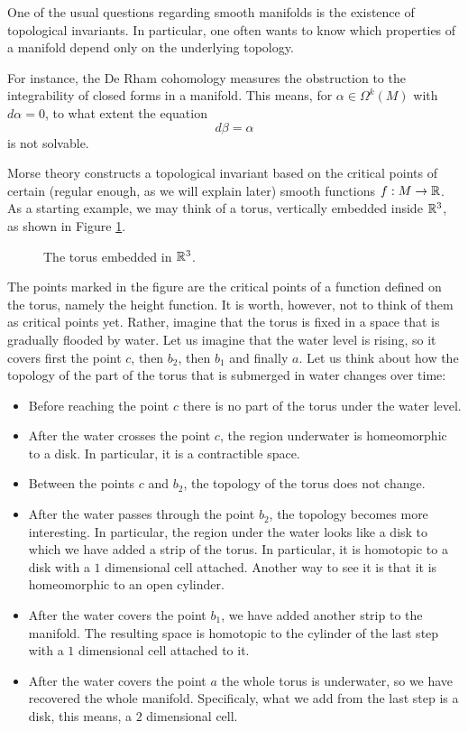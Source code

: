 One of the usual questions regarding smooth manifolds is the existence of topological invariants. In particular, one often wants to know which properties of a manifold depend only on the underlying topology.

For instance, the De Rham cohomology measures the obstruction to the integrability of closed forms in a manifold. This means, for $\alpha \in \Omega^k(M)$ with $d\alpha = 0$, to what extent the equation
\[d\beta = \alpha\]
is not solvable.

Morse theory constructs a topological invariant based on the critical points of certain (regular enough, as we will explain later) smooth functions $f : M \rightarrow \mathbb{R}$. As a starting example, we may think of a torus, vertically embedded inside $\mathbb{R}^3$, as shown in Figure \ref{figure:torus}.

\begin{figure}[h]
	\centering
	
	\caption{The torus embedded in $\mathbb{R}^3$.}
	\label{figure:torus}
\end{figure}

The points marked in the figure are the critical points of a function defined on the torus, namely the height function. It is worth, however, not to think of them as critical points yet. Rather, imagine that the torus is fixed in a space that is gradually flooded by water. Let us imagine that the water level is rising, so it covers first the point $c$, then $b_2$, then $b_1$ and finally $a$. Let us think about how the topology of the part of the torus that is submerged in water changes over time:

\begin{itemize}
	\item Before reaching the point $c$ there is no part of the torus under the water level.
	\item After the water crosses the point $c$, the region underwater is homeomorphic to a disk. In particular, it is a contractible space.
	\item Between the points $c$ and $b_2$, the topology of the torus does not change.
	\item After the water passes through the point $b_2$, the topology becomes more interesting. In particular, the region under the water looks like a disk to which we have added a strip of the torus. In particular, it is homotopic to a disk with a $1$ dimensional cell attached. Another way to see it is that it is homeomorphic to an open cylinder.
	\item After the water covers the point $b_1$, we have added another strip to the manifold. The resulting space is homotopic to the cylinder of the last step with a $1$ dimensional cell attached to it.
	\item After the water covers the point $a$ the whole torus is underwater, so we have recovered the whole manifold. Specificaly, what we add from the last step is a disk, this means, a $2$ dimensional cell.
\end{itemize}


